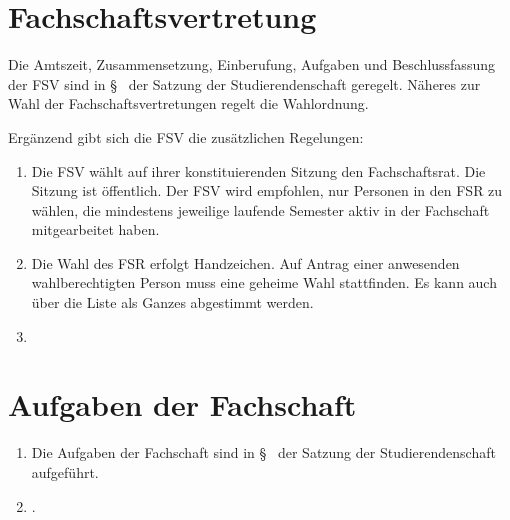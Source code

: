 \documentclass[
	a4paper,
	12pt,
	oneside,
	parskip=half-,
	pagesize,
	headsepline,
	german,
	ngerman
]{scrartcl}
\begin{document}
\section{Fachschaftsvertretung}
Die Amtszeit, Zusammensetzung, Einberufung, Aufgaben und Beschlussfassung der FSV sind in §~ der Satzung der Studierendenschaft geregelt. Näheres zur Wahl der Fachschaftsvertretungen regelt die Wahlordnung.

Ergänzend gibt sich die FSV die zusätzlichen Regelungen:
\begin{enumerate}
	\item Die FSV wählt auf ihrer konstituierenden Sitzung den Fachschaftsrat. Die Sitzung ist öffentlich. Der FSV wird empfohlen, nur Personen in den FSR zu wählen, die mindestens  jeweilige laufende Semester aktiv in der Fachschaft mitgearbeitet haben.
	\item Die Wahl des FSR erfolgt  Handzeichen. Auf Antrag einer anwesenden wahlberechtigten Person muss eine geheime Wahl stattfinden. Es kann auch über die Liste als Ganzes abgestimmt werden.
	\item {}
\end{enumerate}

\section{Aufgaben der Fachschaft}
\begin{enumerate}
	\item Die Aufgaben der Fachschaft sind in §~ der Satzung der Studierendenschaft aufgeführt.
	\item {}.
\end{enumerate}
\end{document}
